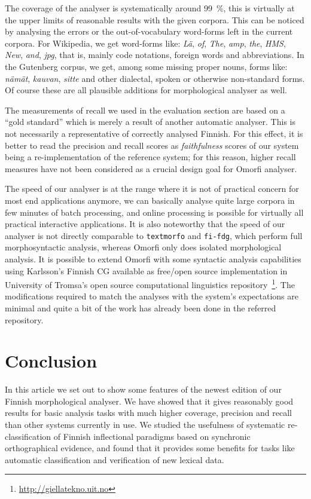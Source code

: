 \documentclass[a4paper,12pt]{article}
\begin{document}
The coverage of the analyser is systematically around 99~\%, this is virtually
at the upper limits of reasonable results with the given corpora. This can be
noticed by analysing the errors or the out-of-vocabulary word-forms left in the
current corpora. For Wikipedia, we get word-forms like: \emph{Lä}, \emph{of},
\emph{The}, \emph{amp}, \emph{the}, \emph{HMS}, \emph{New},
\emph{and}, \emph{jpg}, that is, mainly code notations, foreign words and
abbreviations. In the Gutenberg corpus, we get, among some missing proper
nouns, forms like: \emph{nämät}, \emph{kauvan}, \emph{sitte} and other
dialectal, spoken or otherwise non-standard forms. Of course these are all
plausible additions for morphological analyser as well.

The measurements of recall we used in the evaluation section are based on a
``gold standard'' which is merely a result of another automatic analyser. This
is not necessarily a representative of correctly analysed Finnish. For this
effect, it is better to read the precision and recall scores as
\emph{faithfulness} scores of our system being a re-implementation of the
reference system; for this reason, higher recall measures have not been
considered as a crucial design goal for Omorfi analyser.

The speed of our analyser is at the range where it is not of practical concern
for most end applications anymore, we can basically analyse quite large corpora
in few minutes of batch processing, and online processing is possible for
virtually all practical interactive applications.  It is also noteworthy that
the speed of our analyser is not directly comparable to \texttt{textmorfo} and
\texttt{fi-fdg}, which perform full morphosyntactic analysis, whereas Omorfi
only does isolated morphological analysis. It is possible to extend Omorfi with
some syntactic analysis capabilities using Karlsson's Finnish CG available as
free/open source implementation in University of Tromsa's open source
computational linguistics
repository~\footnote{\url{http://giellatekno.uit.no}}. The modifications
required to match the analyses with the system's expectations are minimal and
quite a bit of the work has already been done in the referred repository.


\section{Conclusion}
\label{sec:conclusion}

In this article we set out to show some features of the newest edition of our
Finnish morphological analyser. We have showed that it gives reasonably good
results for basic analysis tasks with much higher coverage, precision and recall
than other systems currently in use. We studied the usefulness of systematic
re-classification of Finnish inflectional paradigms based on synchronic
orthographical evidence, and found that it provides some benefits for tasks
like automatic classification and verification of new lexical data.



\end{document}
